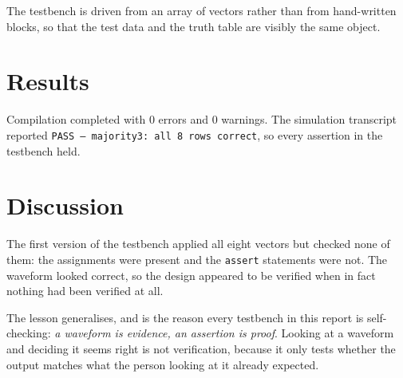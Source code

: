 The testbench is driven from an array of vectors rather than from hand-written
blocks, so that the test data and the truth table are visibly the same object.

\section{Results}



Compilation completed with 0 errors and 0 warnings. The simulation transcript
reported \texttt{PASS --- majority3: all 8 rows correct}, so every assertion in
the testbench held.

\section{Discussion}

The first version of the testbench applied all eight vectors but checked none of
them: the assignments were present and the \texttt{assert} statements were not.
The waveform looked correct, so the design appeared to be verified when in fact
nothing had been verified at all.

The lesson generalises, and is the reason every testbench in this report is
self-checking: \emph{a waveform is evidence, an assertion is proof}. Looking at a
waveform and deciding it seems right is not verification, because it only tests
whether the output matches what the person looking at it already expected.
